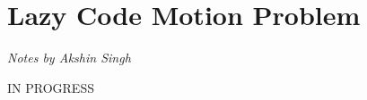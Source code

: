 \section{Lazy Code Motion Problem}
\begin{flushright}
\textit{Notes by Akshin Singh}
\end{flushright}

IN PROGRESS